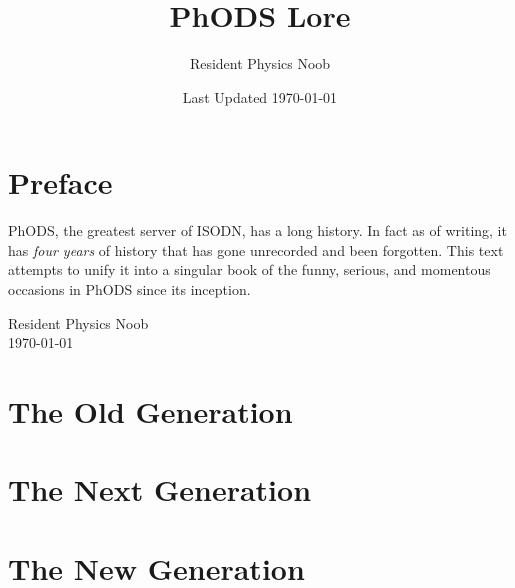 \documentclass[a4paper]{article}
\title{PhODS Lore}
\author{Resident Physics Noob}
\date{Last Updated \today}
\begin{document}
\maketitle
\newpage

\section*{Preface}
PhODS, the greatest server of ISODN, has a long history. In fact as of writing, it has \textit{four years} of history that has gone unrecorded and been forgotten. This text attempts to unify it into a singular book of the funny, serious, and momentous occasions in PhODS since its inception.
\begin{flushright}
    Resident Physics Noob\\
    \today
\end{flushright}
\newpage

\tableofcontents
\newpage


\section{The Old Generation}


\section{The Next Generation}


\section{The New Generation}

\end{document}
